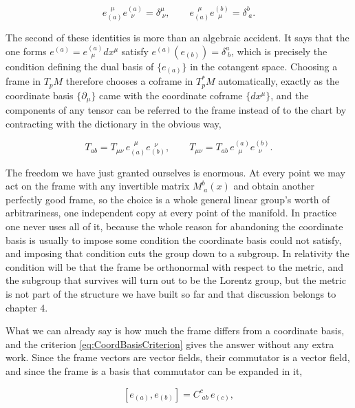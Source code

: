         \begin{equation}\label{eq:FrameInverse}
            e_{(a)}^{\;\;\mu}e^{(a)}_{\;\;\nu} = \delta^{\mu}_{\;\nu}, \qquad e_{(a)}^{\;\;\mu}e^{(b)}_{\;\;\mu} = \delta^{b}_{\;a}.
        \end{equation}

        The second of these identities is more than an algebraic accident. It says that the one forms $e^{(a)} = e^{(a)}_{\;\;\mu}dx^{\mu}$ satisfy $e^{(a)}\left(e_{(b)}\right)=\delta^{a}_{\;b}$, which is precisely the condition defining the dual basis of $\{e_{(a)}\}$ in the cotangent space. Choosing a frame in $T_pM$ therefore chooses a coframe in $T^{*}_pM$ automatically, exactly as the coordinate basis $\{\partial_{\mu}\}$ came with the coordinate coframe $\{dx^{\mu}\}$, and the components of any tensor can be referred to the frame instead of to the chart by contracting with the dictionary in the obvious way,

        \begin{equation}\label{eq:FrameComponents}
            T_{ab} = T_{\mu\nu}\,e_{(a)}^{\;\;\mu}e_{(b)}^{\;\;\nu}, \qquad T_{\mu\nu} = T_{ab}\,e^{(a)}_{\;\;\mu}e^{(b)}_{\;\;\nu}.
        \end{equation}

        The freedom we have just granted ourselves is enormous. At every point we may act on the frame with any invertible matrix $M^{b}_{\;a}(x)$ and obtain another perfectly good frame, so the choice is a whole general linear group's worth of arbitrariness, one independent copy at every point of the manifold. In practice one never uses all of it, because the whole reason for abandoning the coordinate basis is usually to impose some condition the coordinate basis could not satisfy, and imposing that condition cuts the group down to a subgroup. In relativity the condition will be that the frame be orthonormal with respect to the metric, and the subgroup that survives will turn out to be the Lorentz group, but the metric is not part of the structure we have built so far and that discussion belongs to chapter 4.

        What we can already say is how much the frame differs from a coordinate basis, and the criterion \ref{eq:CoordBasisCriterion} gives the answer without any extra work. Since the frame vectors are vector fields, their commutator is a vector field, and since the frame is a basis that commutator can be expanded in it,

        \begin{equation}\label{eq:StructureFunctions2}
            \left[e_{(a)},e_{(b)}\right] = C^{c}_{\;ab}\,e_{(c)},
        \end{equation}

